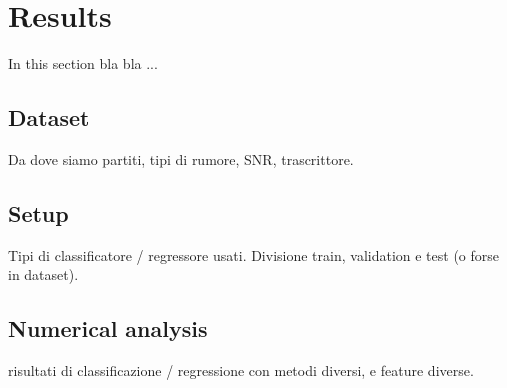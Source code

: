 \section{Results}

In this section bla bla ...

\subsection{Dataset}
Da dove siamo partiti, tipi di rumore, SNR, trascrittore.

\subsection{Setup}
Tipi di classificatore / regressore usati. Divisione train, validation e test (o forse in dataset).

\subsection{Numerical analysis}
risultati di classificazione / regressione con metodi diversi, e feature diverse.
